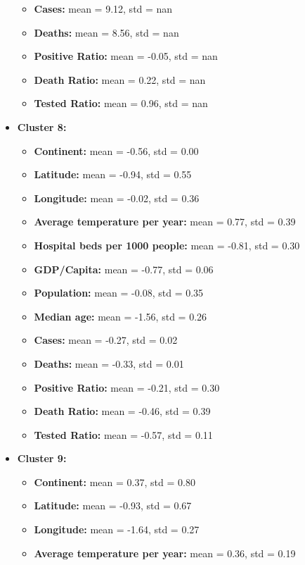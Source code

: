 \documentclass[12pt,a4paper]{article}
\begin{document}
\begin{itemize}
\begin{itemize}
            \item \textbf{Cases:} mean = 9.12, std = nan
            \item \textbf{Deaths:} mean = 8.56, std = nan
            \item \textbf{Positive Ratio:} mean = -0.05, std = nan
            \item \textbf{Death Ratio:} mean = 0.22, std = nan
            \item \textbf{Tested Ratio:} mean = 0.96, std = nan
        \end{itemize}
    \item \textbf{Cluster 8:} 
        \begin{itemize}
            \item \textbf{Continent:} mean = -0.56, std = 0.00
            \item \textbf{Latitude:} mean = -0.94, std = 0.55
            \item \textbf{Longitude:} mean = -0.02, std = 0.36
            \item \textbf{Average temperature per year:} mean = 0.77, std = 0.39
            \item \textbf{Hospital beds per 1000 people:} mean = -0.81, std = 0.30
            \item \textbf{GDP/Capita:} mean = -0.77, std = 0.06
            \item \textbf{Population:} mean = -0.08, std = 0.35
            \item \textbf{Median age:} mean = -1.56, std = 0.26
            \item \textbf{Cases:} mean = -0.27, std = 0.02
            \item \textbf{Deaths:} mean = -0.33, std = 0.01
            \item \textbf{Positive Ratio:} mean = -0.21, std = 0.30
            \item \textbf{Death Ratio:} mean = -0.46, std = 0.39
            \item \textbf{Tested Ratio:} mean = -0.57, std = 0.11
        \end{itemize}
    \item \textbf{Cluster 9:} 
        \begin{itemize}
            \item \textbf{Continent:} mean = 0.37, std = 0.80
            \item \textbf{Latitude:} mean = -0.93, std = 0.67
            \item \textbf{Longitude:} mean = -1.64, std = 0.27
            \item \textbf{Average temperature per year:} mean = 0.36, std = 0.19

\end{itemize}
\end{itemize}
\end{document}
